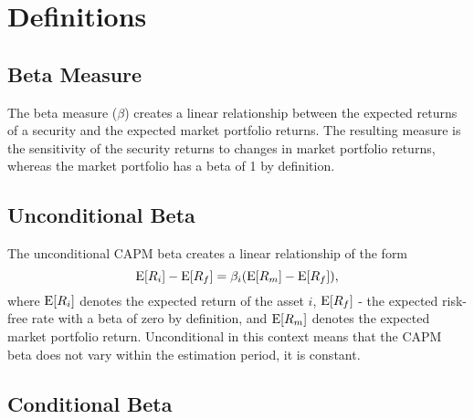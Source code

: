 \documentclass[11pt,a4paper]{article}
\begin{document}
\newpage
\section{Definitions}


\subsection{Beta Measure}

The beta measure ($\beta$) creates a linear relationship between the expected returns of a security and the expected market portfolio returns. The resulting measure is the sensitivity of the security returns to changes in market portfolio returns, whereas the market portfolio has a beta of 1 by definition.

\subsection{Unconditional Beta} \label{unconditional_beta}

The unconditional CAPM beta creates a linear relationship of the form
\begin{equation}
    \textrm{E}[ R_{i} ] - \textrm{E}[ R_{f} ] = \beta_i ( \textrm{E}[ R_{m} ] - \textrm{E}[ R_{f} ] ),
\end{equation}
where $\textrm{E}[ R_{i} ]$ denotes the expected return of the asset $i$, $\textrm{E}[ R_{f} ]$ - the expected risk-free rate with a beta of zero by definition, and $\textrm{E}[ R_{m} ]$ denotes the expected market portfolio return. Unconditional in this context means that the CAPM beta does not vary within the estimation period, it is constant.




\subsection{Conditional Beta}
\end{document}
